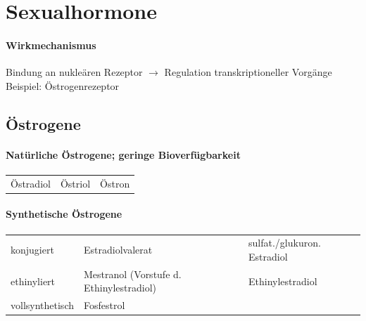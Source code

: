 \documentclass[10pt,a4paper]{report}
\begin{document}
\chapter{Sexualhormone} %
\label{cha:sexualhormone}
\subsubsection{Wirkmechanismus} %
\label{par:wirkmechanismus}
Bindung an nukleären Rezeptor 
$\rightarrow$ Regulation transkriptioneller Vorgänge\\
Beispiel: Östrogenrezeptor
\section{Östrogene} %
\label{sec:_strogene}
\subsubsection{Natürliche Östrogene; geringe Bioverfügbarkeit}
\begin{tabularx}{\textwidth}{XXX}
Östradiol&Östriol&Östron\\ 
\end{tabularx}
\subsubsection{Synthetische Östrogene}
\begin{tabularx}{\textwidth}{XXX}
konjugiert&Estradiolvalerat&sulfat./glukuron. Estradiol\\
ethinyliert&Mestranol (Vorstufe d. Ethinylestradiol)&Ethinylestradiol\\
vollsynthetisch&Fosfestrol&\\
\end{tabularx}
\end{document}

